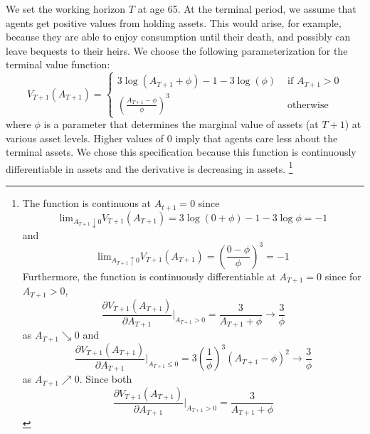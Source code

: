 \documentclass[\econtexRoot/ImaiKeane]{subfiles}
\begin{document}
We set the working horizon $T$ at age 65. At the terminal period, we assume that agents get positive values from holding assets. This would arise, for example, because they are able to enjoy consumption until their death, and possibly can leave bequests to their heirs. We choose the following parameterization for the terminal value function:
\begin{equation} \tag{8}
  V_{T+1}(A_{T+1}) = \begin{cases}
        3 \log(A_{T+1} + \phi) - 1 - 3 \log(\phi) & \mbox{ if $A_{T+1}>0$}\\
        (\frac{A_{T+1}-\phi}{\phi})^3 & \mbox{ otherwise}
            \end{cases}
          \end{equation}
          where $\phi$ is a parameter that determines the marginal value of assets (at $T + 1$) at various asset levels. Higher values of 0 imply that agents care less about the terminal assets. We chose this specification because this function is continuously differentiable in assets and the derivative is decreasing in assets. \footnote[7]{The function is continuous at $A_{t+1}=0$ since
            \begin{equation*}
              \text{lim}_{A_{T+1} \downarrow 0} V_{T+1} (A_{T+1}) = 3 \log(0 + \phi) - 1 - 3 \log \phi = -1
            \end{equation*}
            and
            \begin{equation*}
              \text{lim}_{A_{T+1} \uparrow 0} V_{T+1} (A_{T+1}) = (\dfrac{0-\phi}{\phi})^3 = -1
            \end{equation*}
            Furthermore, the function is continuously differentiable at $A_{T+1}=0$ since for $A_{T+1}>0$,
            \begin{equation*}
             \dfrac{\partial V_{T+1} (A_{T+1})}{\partial A_{T+1}}|_{A_{T+1}>0} = \dfrac{3}{A_{T+1}+\phi} \to \frac{3}{\phi}
           \end{equation*}
           as $A_{T+1} \searrow 0$ and
           \begin{equation*}
             \dfrac{\partial V_{T+1} (A_{T+1})}{\partial A_{T+1}}|_{A_{T+1} \leq 0} = 3 (\frac{1}{\phi})^3(A_{T+1}-\phi)^2 \to \frac{3}{\phi}
           \end{equation*}
           as $A_{T+1} \nearrow 0$. Since both
           \begin{equation*}
             \dfrac{\partial V_{T+1} (A_{T+1})}{\partial A_{T+1}}|_{A_{T+1}>0} = \dfrac{3}{A_{T+1}+\phi}
           \end{equation*}
}
\end{document}
